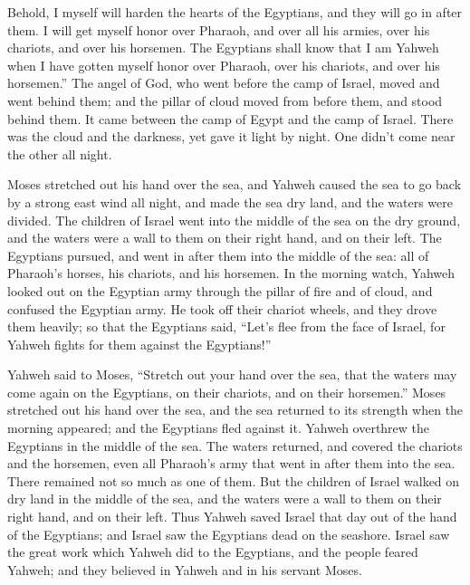 {Behold, I myself will harden the hearts of the Egyptians, and they will go in after them. I will get myself honor over Pharaoh, and over all his armies, over his chariots, and over his horsemen.
The Egyptians shall know that I am Yahweh when I have gotten myself honor over Pharaoh, over his chariots, and over his horsemen.”
The angel of God, who went before the camp of Israel, moved and went behind them; and the pillar of cloud moved from before them, and stood behind them.
It came between the camp of Egypt and the camp of Israel. There was the cloud and the darkness, yet gave it light by night. One didn’t come near the other all night.
\par }{\PP {}Moses stretched out his hand over the sea, and Yahweh caused the sea to go back by a strong east wind all night, and made the sea dry land, and the waters were divided.
The children of Israel went into the middle of the sea on the dry ground, and the waters were a wall to them on their right hand, and on their left.
The Egyptians pursued, and went in after them into the middle of the sea: all of Pharaoh’s horses, his chariots, and his horsemen.
In the morning watch, Yahweh looked out on the Egyptian army through the pillar of fire and of cloud, and confused the Egyptian army.
He took off their chariot wheels, and they drove them heavily; so that the Egyptians said, “Let’s flee from the face of Israel, for Yahweh fights for them against the Egyptians!”
\par }{\PP {}Yahweh said to Moses, “Stretch out your hand over the sea, that the waters may come again on the Egyptians, on their chariots, and on their horsemen.”
Moses stretched out his hand over the sea, and the sea returned to its strength when the morning appeared; and the Egyptians fled against it. Yahweh overthrew the Egyptians in the middle of the sea.
The waters returned, and covered the chariots and the horsemen, even all Pharaoh’s army that went in after them into the sea. There remained not so much as one of them.
But the children of Israel walked on dry land in the middle of the sea, and the waters were a wall to them on their right hand, and on their left.
Thus Yahweh saved Israel that day out of the hand of the Egyptians; and Israel saw the Egyptians dead on the seashore.
Israel saw the great work which Yahweh did to the Egyptians, and the people feared Yahweh; and they believed in Yahweh and in his servant Moses.

}
